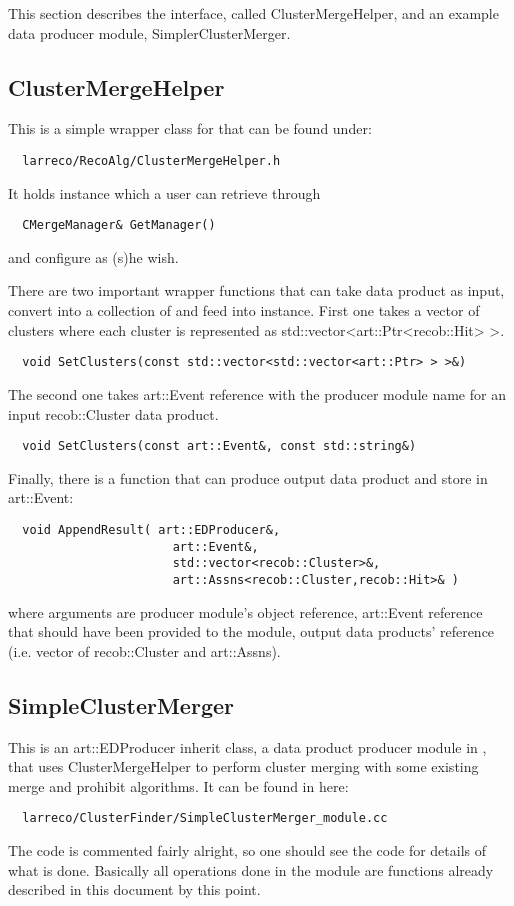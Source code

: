 
This section describes the {\larsoft} interface, called {\ttfamily ClusterMergeHelper}, and an example data producer module, {\ttfamily SimplerClusterMerger}.

\subsection{{\ttfamily ClusterMergeHelper}}
This is a simple wrapper class for {\cmerge} that can be found under:
\begin{lstlisting}
  larreco/RecoAlg/ClusterMergeHelper.h
\end{lstlisting}
It holds {\cmerge} instance which a user can retrieve through
\begin{lstlisting}
  CMergeManager& GetManager()
\end{lstlisting}
and configure as (s)he wish. 

There are two important wrapper functions that can take {\larsoft} data product as input, convert into a collection of {\pxhit} and feed into {\cmerge} instance. First one takes a vector of clusters where each cluster is represented as {\ttfamily std::vector<art::Ptr<recob::Hit> >}.
\begin{lstlisting}
  void SetClusters(const std::vector<std::vector<art::Ptr> > >&)
\end{lstlisting}
The second one takes {\ttfamily art::Event} reference with the producer module name for an input {\ttfamily recob::Cluster} data product.
\begin{lstlisting}
  void SetClusters(const art::Event&, const std::string&)
\end{lstlisting}

Finally, there is a function that can produce output data product and store in {\ttfamily art::Event}:
\begin{lstlisting}
  void AppendResult( art::EDProducer&,
                       art::Event&,
                       std::vector<recob::Cluster>&,
                       art::Assns<recob::Cluster,recob::Hit>& )
\end{lstlisting}
where arguments are producer module's object reference, {\ttfamily art::Event} reference that should have been provided to the module, output data products' reference (i.e. vector of {\ttfamily recob::Cluster} and {\ttfamily art::Assns}).

\subsection{\ttfamily SimpleClusterMerger}
This is an {\ttfamily art::EDProducer} inherit class, a data product producer module in {\larsoft}, that uses {\ttfamily ClusterMergeHelper} to perform cluster merging with some existing merge and prohibit algorithms.
It can be found in here:
\begin{lstlisting}
  larreco/ClusterFinder/SimpleClusterMerger_module.cc
\end{lstlisting}
The code is commented fairly alright, so one should see the code for details of what is done.
Basically all operations done in the module are functions already described in this document by this point.
